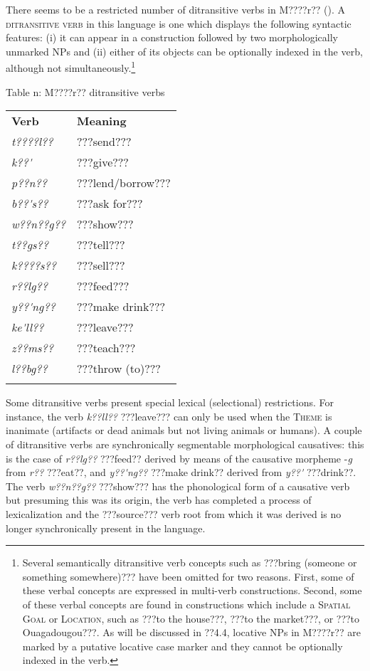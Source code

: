 \documentclass[output=paper]{langsci/langscibook}
\begin{document}
There seems to be a restricted number of ditransitive verbs in M????r?? (). A \textsc{ditransitive verb} in this language is one which displays the following syntactic features: (i) it can appear in a construction followed by two morphologically unmarked NPs and (ii) either of its objects can be optionally indexed in the verb, although not simultaneously.\footnote{ {Several semantically ditransitive verb concepts such as ???bring (someone or something somewhere)??? have been omitted for two reasons. First, some of these verbal concepts are expressed in multi-verb constructions. Second, some of these verbal concepts are found in constructions which include a }{\textsc{Spatial}}{ }{\textsc{Goal}}{ or }{\textsc{Location}}{, such as ???to the house???, ???to the market???, or ???to Ouagadougou???. As will be discussed in ??4.4, locative NPs in M????r?? are marked by a putative locative case marker and they cannot be optionally indexed in the verb.} }{ }

\begin{table}\caption{
\label{bkm:Ref446635932}Table n: M????r?? ditransitive verbs
}\end{table}

\begin{tabularx}{\textwidth}{XX}
\lsptoprule

\textbf{Verb} & \textbf{Meaning}\\
\textit{t????l??} & ???send???\\
\textit{k}\textit{??\'{ }} & ???give???\\
\textit{p??n??} & ???lend/borrow???\\
\textit{b??\'{ }s??} & ???ask for???\\
\textit{w??n??g??} & ???show???\\
\textit{t}\textit{??gs??} & ???tell???\\
\textit{k}\textit{????}\textit{s??} & ???sell???\\
\textit{r??lg??} & ???feed???\\
\textit{y??\'{ }ng??} & ???make drink???\\
\textit{ke}\textit{\'{ }ll??} & ???leave???\\
\textit{z??ms??} & ???teach???\\
\textit{l??bg??} & ???throw (to)???\\
\lspbottomrule
\end{tabularx}
Some ditransitive verbs present special lexical (selectional) restrictions. For instance, the verb \textit{k??ll??} ???leave??? can only be used when the \textsc{Theme} is inanimate (artifacts or dead animals but not living animals or humans). A couple of ditransitive verbs are synchronically segmentable morphological causatives: this is the case of \textit{r??lg??} ???feed?? derived by means of the causative morpheme -\textit{g} from \textit{r??} ???eat??, and \textit{y??\'{ }ng??} ???make drink?? derived from \textit{y??\'{ }} ???drink??. The verb \textit{w??n??g??} ???show??? has the phonological form of a causative verb but presuming this was its origin, the verb has completed a process of lexicalization and the ???source??? verb root from which it was derived is no longer synchronically present in the language. 
\end{document}
